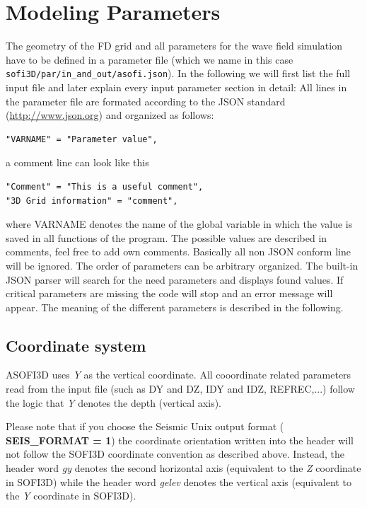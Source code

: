 \documentclass{hitec}
\begin{document}
\section{Modeling Parameters}
\label{modelgeom}
The geometry of the FD grid and all parameters for the wave field simulation have to be defined in a parameter file (which we name in this case { \lstinline{sofi3D/par/in_and_out/asofi.json}}). In the following we will first list the full input file and later explain every input parameter section in detail:
All lines in the parameter file are formated according to the JSON standard (\url{http://www.json.org}) and organized as follows: 

\begin{verbatim}
"VARNAME" = "Parameter value",
\end{verbatim}

a comment line can look like this

\begin{verbatim}
"Comment" = "This is a useful comment",
"3D Grid information" = "comment",
\end{verbatim}

where VARNAME denotes the name of the global variable in which the value is saved in all functions of the program. The possible values are described in comments, feel free to add own comments. Basically all non JSON conform line will be ignored. The order of parameters can be arbitrary organized. The built-in JSON parser will search for the need parameters and displays found values. If critical parameters are missing the code will stop and an error message will appear. The meaning of the different parameters is described in the following.

\subsection{Coordinate system}
\label{coord_system}
ASOFI3D uses \textit{Y} as the vertical coordinate. All cooordinate related parameters read from the input file (such as DY and DZ, IDY and IDZ, REFREC,...) follow the logic that \textit{Y} denotes the depth (vertical axis).

Please note that if you choose the Seismic Unix output format ( \textbf{SEIS\_FORMAT = 1}) the coordinate orientation written into the header will not follow the SOFI3D coordinate convention as described above. Instead, the header word \textit{gy} denotes the second horizontal axis (equivalent to the \textit{Z} coordinate in SOFI3D) while the header word \textit{gelev} denotes the vertical axis (equivalent to the \textit{Y} coordinate in SOFI3D).
\end{document}
